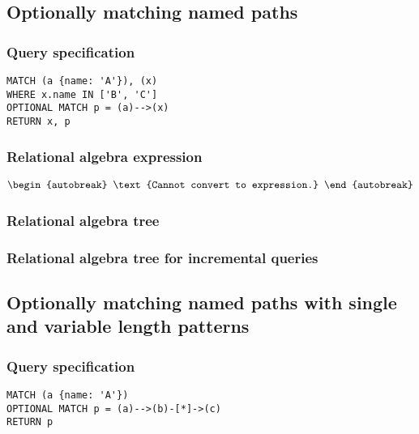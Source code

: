 \subsection{Optionally matching named paths}

\subsubsection*{Query specification}

\begin{lstlisting}
MATCH (a {name: 'A'}), (x)
WHERE x.name IN ['B', 'C']
OPTIONAL MATCH p = (a)-->(x)
RETURN x, p
\end{lstlisting}

\subsubsection*{Relational algebra expression}

\begin{align*}
\begin{autobreak}
\text{Cannot convert to expression.}
\end{autobreak}
\end{align*}

\subsubsection*{Relational algebra tree}


\subsubsection*{Relational algebra tree for incremental queries}


\subsection{Optionally matching named paths with single and variable length patterns}

\subsubsection*{Query specification}

\begin{lstlisting}
MATCH (a {name: 'A'})
OPTIONAL MATCH p = (a)-->(b)-[*]->(c)
RETURN p
\end{lstlisting}

